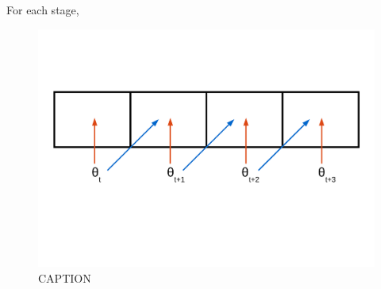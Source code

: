 \documentclass[12pt,letterpaper]{article}
\begin{document}
For each stage, 


\begin{figure}[ht]
  \centering
  \includegraphics[height = 0.5\textheight, width = \textwidth, keepaspectratio = true]{figure/predict_perform}
  \caption{CAPTION}
  \label{fig:concept}
\end{figure}
\end{document}
